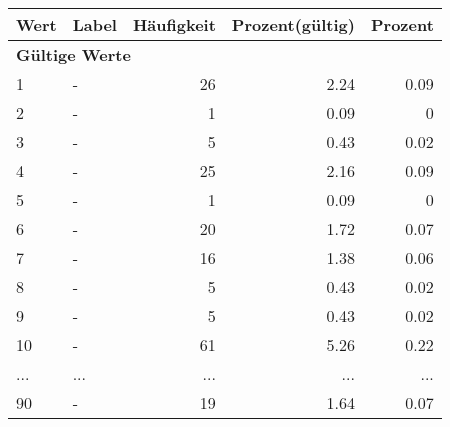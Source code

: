      \begin{longtable}{lXrrr}
     \toprule
     \textbf{Wert} & \textbf{Label} & \textbf{Häufigkeit} & \textbf{Prozent(gültig)} & \textbf{Prozent} \\
     \endhead
     \midrule
     \multicolumn{5}{l}{\textbf{Gültige Werte}}\\
        1 & \multicolumn{1}{X}{-} & %
          \num{26} &
          \num[round-mode=places,round-precision=2]{2,24} &
          \num[round-mode=places,round-precision=2]{0,09} \\
        2 & \multicolumn{1}{X}{-} & %
          \num{1} &
          \num[round-mode=places,round-precision=2]{0,09} &
          \num[round-mode=places,round-precision=2]{0} \\
        3 & \multicolumn{1}{X}{-} & %
          \num{5} &
          \num[round-mode=places,round-precision=2]{0,43} &
          \num[round-mode=places,round-precision=2]{0,02} \\
        4 & \multicolumn{1}{X}{-} & %
          \num{25} &
          \num[round-mode=places,round-precision=2]{2,16} &
          \num[round-mode=places,round-precision=2]{0,09} \\
        5 & \multicolumn{1}{X}{-} & %
          \num{1} &
          \num[round-mode=places,round-precision=2]{0,09} &
          \num[round-mode=places,round-precision=2]{0} \\
        6 & \multicolumn{1}{X}{-} & %
          \num{20} &
          \num[round-mode=places,round-precision=2]{1,72} &
          \num[round-mode=places,round-precision=2]{0,07} \\
        7 & \multicolumn{1}{X}{-} & %
          \num{16} &
          \num[round-mode=places,round-precision=2]{1,38} &
          \num[round-mode=places,round-precision=2]{0,06} \\
        8 & \multicolumn{1}{X}{-} & %
          \num{5} &
          \num[round-mode=places,round-precision=2]{0,43} &
          \num[round-mode=places,round-precision=2]{0,02} \\
        9 & \multicolumn{1}{X}{-} & %
          \num{5} &
          \num[round-mode=places,round-precision=2]{0,43} &
          \num[round-mode=places,round-precision=2]{0,02} \\
        10 & \multicolumn{1}{X}{-} & %
          \num{61} &
          \num[round-mode=places,round-precision=2]{5,26} &
          \num[round-mode=places,round-precision=2]{0,22} \\
       ... & ... & ... & ... & ... \\
        90 & \multicolumn{1}{X}{-} & %
          \num{19} &
          \num[round-mode=places,round-precision=2]{1,64} &
          \num[round-mode=places,round-precision=2]{0,07} \\


\end{longtable}
